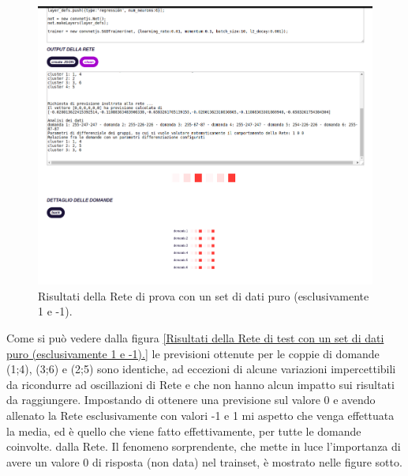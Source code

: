 \begin{figure}[H]
\centering
	\includegraphics[width=1\linewidth]{./image/RetediProva_generatorinputpuro.png}
	\caption{Risultati della Rete di prova con un set di dati puro (esclusivamente 1 e -1).}
	\label{Risultati della Rete di prova con un set di dati puro (esclusivamente 1 e -1).}
	\end{figure}
	\noindent
Come si pu\`o vedere dalla figura \ref{Risultati della Rete di test con un set di dati puro (esclusivamente 1 e -1).} le previsioni ottenute per le coppie di domande (1;4), (3;6) e (2;5) sono identiche, ad eccezioni di alcune variazioni impercettibili da ricondurre ad oscillazioni di Rete e che non hanno alcun impatto sui risultati da raggiungere. Impostando di ottenere una previsione sul valore 0 e avendo allenato la Rete esclusivamente con valori -1 e 1 mi aspetto che venga effettuata la media, ed \`e quello che viene fatto effettivamente, per tutte le domande coinvolte. dalla Rete.
Il fenomeno sorprendente, che mette in luce l'importanza di avere un valore 0 di risposta (non data) nel trainset, \`e mostrato nelle figure sotto.
